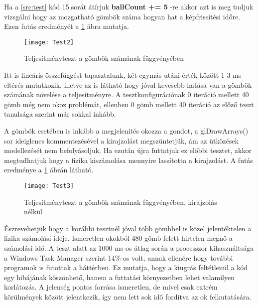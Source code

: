 Ha a \ref{src:test} kód 15.sorát átírjuk \textbf{ballCount += 5} -re akkor azt is meg tudjuk vizsgálni hogy az mozgatható gömbök száma hogyan hat a képfrissítési időre. Ezen futás eredményét a \ref{fig:Test2} ábra mutatja.

\begin{figure}[H]
	\centering
	\texttt{[image: Test2]}
	\caption{Teljesítményteszt a gömbök számának függvényében}
	\label{fig:Test2}
\end{figure}

Itt is lineáris összefüggést tapasztalunk, két egymás utáni érték között 1-3 ms eltérés mutatkozik, illetve az is látható hogy jóval kevesebb hatása van a gömbök számának növelése a teljesítményre. A tesztkonfigurációnak 0 iteráció mellett 40 gömb még nem okoz problémát, ellenben 0 gömb mellett 40 iteráció az előző teszt tanulsága szerint már sokkal inkább.

A gömbök esetében is inkább a megjelenítés okozza a gondot, a glDrawArrays() sor ideiglenes kommentezésével a kirajzolást megszüntetjük, ám az ütközések modellezését nem befolyásoljuk. Ha ezután újra futtatjuk ez előbbi tesztet, akkor megtudhatjuk hogy a fizika kiszámolása mennyire lassította a kirajzolást. A futás eredménye a \ref{fig:Test2} ábrán látható.

\begin{figure}[H]
	\centering
	\texttt{[image: Test3]}
	\caption{Teljesítményteszt a gömbök számának függvényében, kirajzolás nélkül}
	\label{fig:Test3}
\end{figure}

Észrevehetjük hogy a korábbi tesztnél jóval több gömbbel is közel jelentéktelen a fizika számolási ideje. Ismeretlen okokból 480 gömb felett hirtelen megnő a számolási idő. A teszt alatt az 1000 ms-os átlag során a processzor kihasználtsága a Windows Task Manager szerint 14\%-os volt, annak ellenére hogy további programok is futottak a háttérben. Ez mutatja, hogy a kiugrás feltétlenül a kód egy hibájának köszönhető, hanem a futtatási környezetben lehet valamilyen korlátozás. A jelenség pontos forrása ismeretlen, de mivel csak extrém körülmények között jelentkezik, így nem lett sok idő fordítva az ok felkutatására.